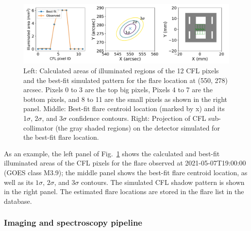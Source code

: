 \documentclass[referee]{preaa} %
\begin{document}
\begin{figure}
  \centering
  \includegraphics[width=0.95\linewidth]{figures/cflMay07.pdf}
  \caption{
   Left: Calculated areas of illuminated regions of the 12 CFL pixels and the best-fit simulated pattern for the flare location at (550, 278) arcsec. Pixels 0 to 3 are the top big pixels, Pixels 4 to 7 are the bottom pixels, and 8 to 11 are the small pixels as shown in the right panel.
   Middle: Best-fit flare centroid location (marked by x) and its 1$\sigma$, 2$\sigma$, and 3$\sigma$ confidence contours. Right: Projection of CFL sub-collimator (the gray shaded regions) on the detector simulated for the best-fit flare location. }
  \label{fig:cfl}
\end{figure}
As an example, the left panel of Fig.~\ref{fig:cfl} shows the calculated and best-fit illuminated areas of the CFL pixels for the flare observed at 2021-05-07T19:00:00 (GOES class M3.9);  the middle panel shows the best-fit flare centroid location, as well as its $1\sigma$, $2\sigma$, and $3\sigma$ contours. 
The simulated CFL shadow pattern is shown in the right panel. 
The estimated flare locations are stored in the flare list in the database. 

\subsubsection{Imaging and spectroscopy pipeline}
\end{document}
